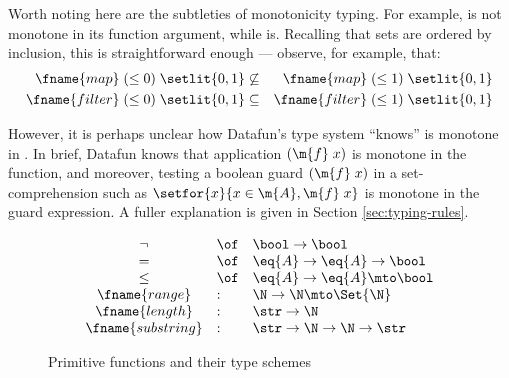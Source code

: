 Worth noting here are the subtleties of monotonicity typing. For example,
 is not monotone in its function argument, while  is.
Recalling that sets are ordered by inclusion, this is straightforward enough ---
observe, for example, that:
\begin{eqnarray*}
 \fname{map}\;(\le 0)\;\setlit{0,1}
 &\not\subseteq& \fname{map}\;(\le 1)\;\setlit{0,1}\\
 \fname{filter}\;(\le 0)\;\setlit{0,1}
 &\subseteq& \fname{filter}\;(\le 1)\;\setlit{0,1}
\end{eqnarray*}

However, it is perhaps unclear how Datafun's type system ``knows''
 is monotone in . In brief, Datafun knows that application
$(\m{f}\;x)$ is monotone in the function, and moreover, testing a boolean guard
$(\m{f}\;x)$ in a set-comprehension such as $\setfor{x}{x \in \m{A}, \m{f}\;x}$
is monotone in the guard expression. A fuller explanation is given in Section
\ref{sec:typing-rules}.



\begin{figure}
  \[\begin{array}{cll}
  \neg &\of& \bool \uto \bool\\
  =   &\of& \eq{A} \uto \eq{A} \uto \bool\\
  \le &\of& \eq{A} \uto \eq{A} \mto \bool\\
  \fname{range}    &:& \N \uto \N \mto \Set{\N}\\
  \fname{length}   &:& \str \uto \N\\
  \fname{substring} &:& \str \uto \N \uto \N \uto \str
  \end{array}\]
  \caption{Primitive functions and their type schemes}
  \label{fig:primitives}
\end{figure}

